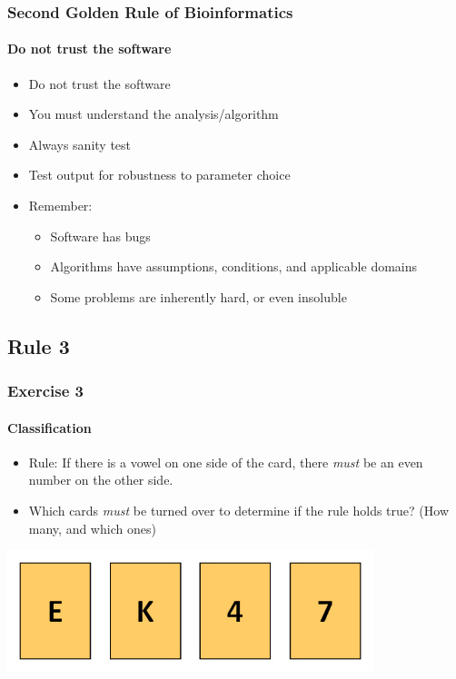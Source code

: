 \documentclass[table]{beamer}
\begin{document}
  \begin{frame}
    \frametitle{Second Golden Rule of Bioinformatics}
    \framesubtitle{Do not trust the software}
	\begin{itemize}
	  \item Do not trust the software
	  \item You must understand the analysis/algorithm
	  \item Always sanity test
	  \item Test output for robustness to parameter choice
	  \item Remember:
	  \begin{itemize}
	    \item Software has bugs
	    \item Algorithms have assumptions, conditions, and applicable domains
	    \item Some problems are inherently hard, or even insoluble
	  \end{itemize}
	\end{itemize}
  \end{frame}

  \subsection{Rule 3}  
  \begin{frame}
    \frametitle{Exercise 3}
    \framesubtitle{Classification}
    \begin{itemize}
      \item Rule: If there is a vowel on one side of the card, there \textit{must} be an even number on the other side.
      \item Which cards \textit{must} be turned over to determine if the rule holds true? (How many, and which ones)
    \end{itemize}
    \includegraphics[width=0.8\textwidth]{images/wason}
  \end{frame}
\end{document}
